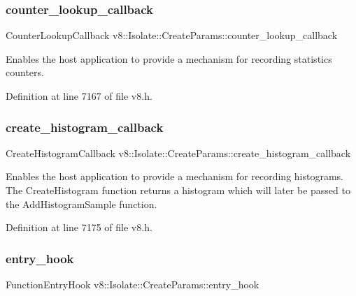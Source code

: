 \subsubsection{\texorpdfstring{counter\+\_\+lookup\+\_\+callback}{counter\_lookup\_callback}}
{\footnotesize\ttfamily Counter\+Lookup\+Callback v8\+::\+Isolate\+::\+Create\+Params\+::counter\+\_\+lookup\+\_\+callback}

Enables the host application to provide a mechanism for recording statistics counters. 

Definition at line 7167 of file v8.\+h.

\mbox{\label{structv8_1_1Isolate_1_1CreateParams_a11acf5fb9cdbc4c8bf15baf542507b49}} 
\subsubsection{\texorpdfstring{create\+\_\+histogram\+\_\+callback}{create\_histogram\_callback}}
{\footnotesize\ttfamily Create\+Histogram\+Callback v8\+::\+Isolate\+::\+Create\+Params\+::create\+\_\+histogram\+\_\+callback}

Enables the host application to provide a mechanism for recording histograms. The Create\+Histogram function returns a histogram which will later be passed to the Add\+Histogram\+Sample function. 

Definition at line 7175 of file v8.\+h.

\mbox{\label{structv8_1_1Isolate_1_1CreateParams_aa7aa18bbe2d86713e5b074a93b38dc60}} 
\subsubsection{\texorpdfstring{entry\+\_\+hook}{entry\_hook}}
{\footnotesize\ttfamily Function\+Entry\+Hook v8\+::\+Isolate\+::\+Create\+Params\+::entry\+\_\+hook}

